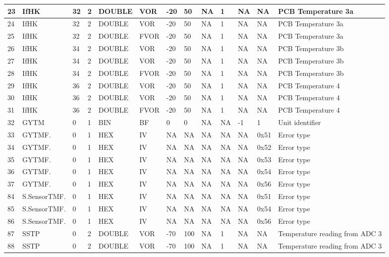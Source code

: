 {\begin{longtable}{|l|l|l|l|l|l|l|l|l|l|l|l|p{}|}
23 & IfHK & 32 & 2 & DOUBLE & VOR & -20 & 50 & NA & 1 & NA & NA & PCB Temperature 3a\\ \hline
24 & IfHK & 32 & 2 & DOUBLE & VOR & -20 & 50 & NA & 1 & NA & NA & PCB Temperature 3a\\ \hline
25 & IfHK & 32 & 2 & DOUBLE & FVOR & -20 & 50 & NA & 1 & NA & NA & PCB Temperature 3a\\ \hline
26 & IfHK & 34 & 2 & DOUBLE & VOR & -20 & 50 & NA & 1 & NA & NA & PCB Temperature 3b\\ \hline
27 & IfHK & 34 & 2 & DOUBLE & VOR & -20 & 50 & NA & 1 & NA & NA & PCB Temperature 3b\\ \hline
28 & IfHK & 34 & 2 & DOUBLE & FVOR & -20 & 50 & NA & 1 & NA & NA & PCB Temperature 3b\\ \hline
29 & IfHK & 36 & 2 & DOUBLE & VOR & -20 & 50 & NA & 1 & NA & NA & PCB Temperature 4\\ \hline
30 & IfHK & 36 & 2 & DOUBLE & VOR & -20 & 50 & NA & 1 & NA & NA & PCB Temperature 4\\ \hline
31 & IfHK & 36 & 2 & DOUBLE & FVOR & -20 & 50 & NA & 1 & NA & NA & PCB Temperature 4\\ \hline
32 & GYTM & 0 & 1 & BIN & BF & 0 & 0 & NA & NA & -1 & 1 & Unit identifier\\ \hline
33 & GYTMF. & 0 & 1 & HEX & IV & NA & NA & NA & NA & NA & 0x51 & Error type\\ \hline
34 & GYTMF. & 0 & 1 & HEX & IV & NA & NA & NA & NA & NA & 0x52 & Error type\\ \hline
35 & GYTMF. & 0 & 1 & HEX & IV & NA & NA & NA & NA & NA & 0x53 & Error type\\ \hline
36 & GYTMF. & 0 & 1 & HEX & IV & NA & NA & NA & NA & NA & 0x54 & Error type\\ \hline
37 & GYTMF. & 0 & 1 & HEX & IV & NA & NA & NA & NA & NA & 0x56 & Error type\\ \hline
84 & S.SensorTMF. & 0 & 1 & HEX & IV & NA & NA & NA & NA & NA & 0x51 & Error type\\ \hline
85 & S.SensorTMF. & 0 & 1 & HEX & IV & NA & NA & NA & NA & NA & 0x54 & Error type\\ \hline
86 & S.SensorTMF. & 0 & 1 & HEX & IV & NA & NA & NA & NA & NA & 0x56 & Error type\\ \hline
87 & SSTP & 0 & 2 & DOUBLE & VOR & -70 & 100 & NA & 1 & NA & NA & Temperature reading from ADC 3\\ \hline
88 & SSTP & 0 & 2 & DOUBLE & VOR & -70 & 100 & NA & 1 & NA & NA & Temperature reading from ADC 3\\ \hline

\end{longtable}}
